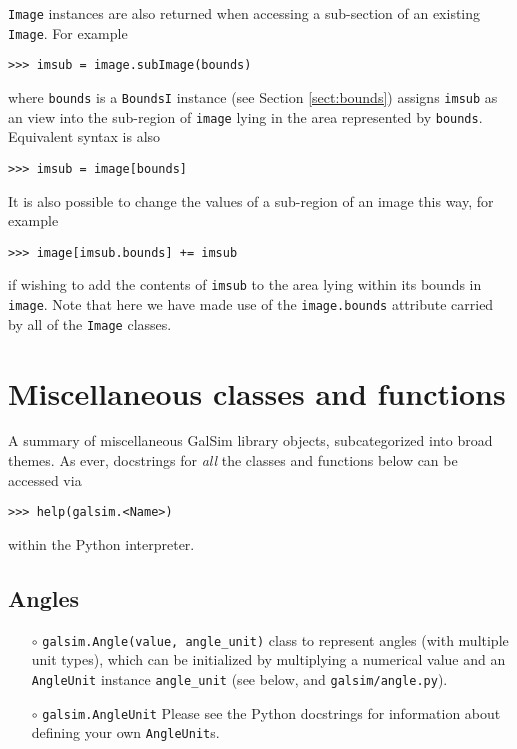 \documentclass[preprint,11pt]{../../devel/modules/aastex}
\begin{document}
\texttt{Image} instances are also returned when
accessing a sub-section of an existing \texttt{Image}.  For example

{\tt >>> imsub = image.subImage(bounds)}

where \texttt{bounds} is a \texttt{BoundsI} instance (see Section
\ref{sect:bounds}) assigns \texttt{imsub} as an view into
the sub-region of \texttt{image} lying in the area represented by
\texttt{bounds}.  Equivalent syntax is also

{\tt >>> imsub = image[bounds]}

It is also possible to change the values of a sub-region of an image
this way, for example

{\tt >>> image[imsub.bounds] += imsub}

if wishing to add the contents of \texttt{imsub} to the area lying
within its bounds in \texttt{image}.  Note that here we have made use of
the \texttt{image.bounds} attribute carried by all of the \texttt{Image}
classes.

\section{Miscellaneous classes and functions}\label{sect:misc}

A summary of miscellaneous GalSim library objects, subcategorized into
broad themes.  As ever, docstrings for \emph{all} the classes and
functions below can be accessed via

{\tt >>> help(galsim.<Name>)}

within the Python interpreter.

\subsection{Angles}\label{sect:angles}
\begin{itemize}

\item[$\circ$] \texttt{galsim.Angle(value, angle\_unit)} \newline
  {class to represent angles (with multiple unit types),
    which can be initialized by multiplying a numerical
    value and an \texttt{AngleUnit} instance \texttt{angle\_unit} (see
    below, and \texttt{galsim/angle.py}).}

\item[$\circ$] \texttt{galsim.AngleUnit} 
 Please see the Python docstrings for information about defining your
 own \texttt{AngleUnit}s.
\end{itemize}
\end{document}
